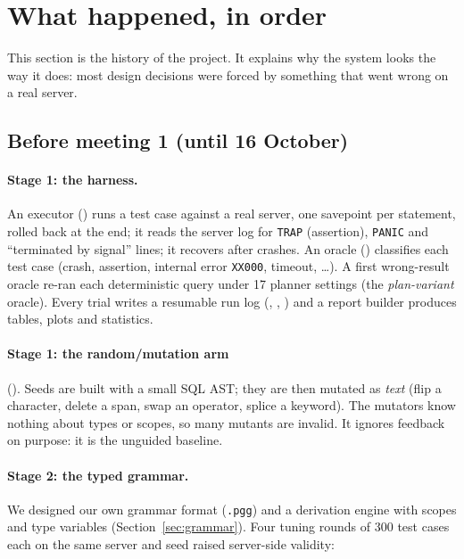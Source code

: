 \section{What happened, in order}
\label{sec:story}

This section is the history of the project. It explains why the system looks
the way it does: most design decisions were forced by something that went
wrong on a real server.

\subsection{Before meeting 1 (until 16 October)}

\paragraph{Stage 1: the harness.} An executor ()
runs a test case against a real \pg server, one savepoint per statement,
rolled back at the end; it reads the server log for \texttt{TRAP} (assertion),
\texttt{PANIC} and ``terminated by signal'' lines; it recovers after crashes.
An oracle () classifies each test case
(crash, assertion, internal error \texttt{XX000}, timeout, \dots). A first
wrong-result oracle re-ran each deterministic query under 17 planner settings
(the \emph{plan-variant} oracle). Every trial writes a resumable run log
(, , ) and a
report builder produces tables, plots and statistics.

\paragraph{Stage 1: the random/mutation arm} (). Seeds
are built with a small SQL AST; they are then mutated as \emph{text} (flip a
character, delete a span, swap an operator, splice a keyword). The mutators
know nothing about types or scopes, so many mutants are invalid. It ignores
feedback on purpose: it is the unguided baseline.

\paragraph{Stage 2: the typed grammar.} We designed our own grammar format
(\texttt{.pgg}) and a derivation engine with scopes and type variables
(Section~\ref{sec:grammar}). Four tuning rounds of 300 test cases each
on the same server and seed raised server-side validity:

